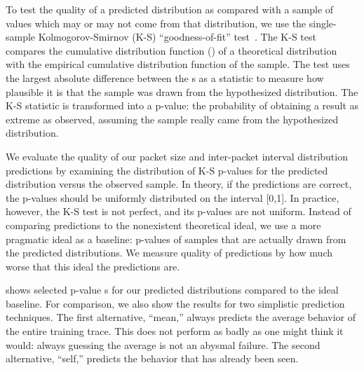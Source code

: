 \documentclass{acm_proc_article-sp}
\begin{document}

To test the quality of a predicted distribution as compared with a sample of values which may or may not come from that distribution, we use the single-sample Kolmogorov-Smirnov (K-S) ``goodness-of-fit'' test~\cite{Feller68}.
The K-S test compares the cumulative distribution function () of a theoretical distribution with the empirical cumulative distribution function of the sample.
The test uses the largest absolute difference between the s as a statistic to measure how plausible it is that the sample was drawn from the hypothesized distribution.
The K-S statistic is transformed into a p-value:
the probability of obtaining a result as extreme as observed, assuming the sample really came from the hypothesized distribution.


We evaluate the quality of our packet size and inter-packet interval distribution predictions by examining the distribution of K-S p-values for the predicted distribution versus the observed sample.
In theory, if the predictions are correct, the p-values should be uniformly distributed on the interval [0,1].
In practice, however, the K-S test is not perfect, and its p-values are not uniform.
Instead of comparing predictions to the nonexistent theoretical ideal, we use a more pragmatic ideal as a baseline:
p-values of samples that are actually drawn from the predicted distributions.
We measure quality of predictions by how much worse that this ideal the predictions are.\ksidealnote

 shows selected p-value s for our predicted distributions compared to the ideal baseline.
For comparison, we also show the results for two simplistic prediction techniques.
The first alternative, ``mean,'' always predicts the average behavior of the entire training trace.
This does not perform as badly as one might think it would:
always guessing the average is not an abysmal failure.
The second alternative, ``self,'' predicts the behavior that has already been seen.
\end{document}
